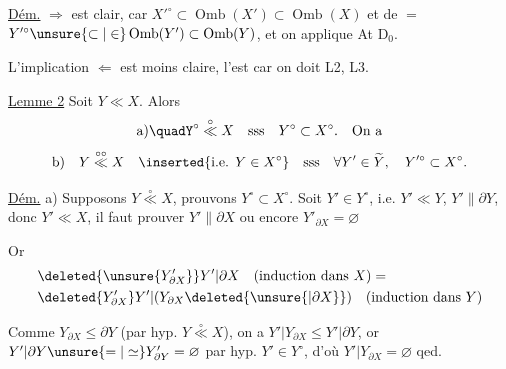 \uline{Dém.} $\Rightarrow$ est clair, car $X'^\circ\subset\operatorname{Omb}(X')\subset\operatorname{Omb}(X)$ et de $=$ $Y'^\circ\unsure{\subset|\in}\operatorname{Omb}(Y')\subset\operatorname{Omb}(Y)$, et on applique At D$_0$.

L'implication $\Leftarrow$ est moins claire,  l'est  car on doit  L2, L3.

\uline{Lemme 2}   Soit $Y\ll X$. Alors
\[
\text{a)}\quadY^\circ\overset{\circ}{\ll}X\quad\text{sss}\quad Y^\circ\subset X^\circ.\quad\text{On a}
\]
\[
\text{b)}\quad Y\overset{\circ\circ}{\ll}X\quad\inserted{\text{i.e. }Y\in X^\circ}\quad\text{sss}\quad\forall Y'\in\widetilde Y,\quad Y'^\circ\subset X^\circ.
\]

\uline{Dém.} a) Supposons $Y\overset{\circ}{\ll}X$, prouvons $Y^\circ\subset X^\circ$. Soit $Y'\in Y^\circ$, i.e. $Y'\ll Y$, $Y'\parallel\partial Y$, donc $Y'\ll X$, il faut prouver $Y'\parallel\partial X$ ou encore $Y'_{\partial X}=\varnothing$


Or
\[
\begin{aligned}
&\deleted{\unsure{Y'_{\partial X}}}Y'|\partial X\quad(\text{induction dans }X)=\\
&\deleted{Y'_{\partial X}}Y'|(Y_{\partial X}\deleted{\unsure{\vert\partial X}})\quad(\text{induction dans }Y)
\end{aligned}
\]
 

Comme $Y_{\partial X}\leq\partial Y$ (par hyp. $Y\overset{\circ}{\ll}X$), on a $Y'|Y_{\partial X}\leq Y'|\partial Y$,  or $Y'|\partial Y\unsure{=|\simeq}Y'_{\partial Y}=\varnothing$ par hyp. $Y'\in Y^\circ$, d'où $Y'|Y_{\partial X}=\varnothing$ qed.

